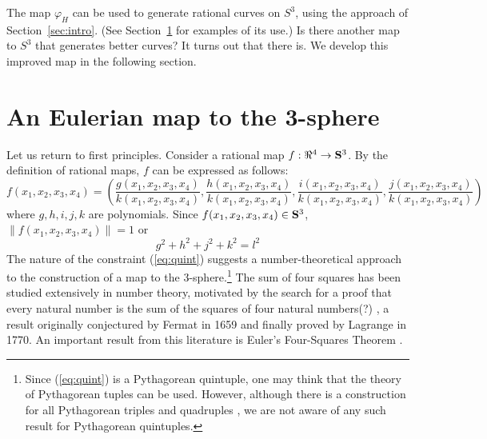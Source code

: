 The map $\varphi_H$ can be used to generate rational curves on $S^3$,
using the approach of Section~\ref{sec:intro}.
(See Section~\ref{} for examples of its use.)
Is there another map to $S^3$ that generates better curves?
It turns out that there is.
We develop this improved map in the following section.


\section{An Eulerian map to the 3-sphere}

Let us return to first principles.
Consider a rational map $f : \Re^4 \rightarrow \mbox{{\bf S}$^{3}$}$.
By the definition of rational maps, $f$ can be expressed as follows:
\[	f(x_1,x_2,x_3,x_4) = (\frac{g(x_1,x_2,x_3,x_4)}{k(x_1,x_2,x_3,x_4)}, 
			      \frac{h(x_1,x_2,x_3,x_4)}{k(x_1,x_2,x_3,x_4)},
			      \frac{i(x_1,x_2,x_3,x_4)}{k(x_1,x_2,x_3,x_4)},
			      \frac{j(x_1,x_2,x_3,x_4)}{k(x_1,x_2,x_3,x_4)}) \]
where $g,h,i,j,k$ are polynomials.
Since $f(x_1,x_2,x_3,x_4) \in \mbox{{\bf S}$^{3}$}$, $\| f(x_1,x_2,x_3,x_4) \| = 1$ or
\begin{equation}
\label{eq:quint}
	g^2 + h^2 + j^2 + k^2 = l^2	
\end{equation}
The nature of the constraint (\ref{eq:quint}) suggests a number-theoretical 
approach to the construction of a map to the 3-sphere.\footnote{Since
	(\ref{eq:quint}) is a Pythagorean quintuple, one may think
	that the theory of Pythagorean tuples can be used.
	However, although there is a construction for all Pythagorean 
	triples \cite{kubota} and quadruples \cite{dietz}, 
	we are not aware of any such result for Pythagorean quintuples.}
The sum of four squares has been studied extensively in number theory,
motivated by the search for a proof that every natural number is the 
sum of the squares of four natural numbers(?) \cite{dickson},
a result originally conjectured by Fermat in 1659 and finally proved
by Lagrange in 1770.
An important result from this literature is Euler's Four-Squares 
Theorem \cite{dickson52}.

